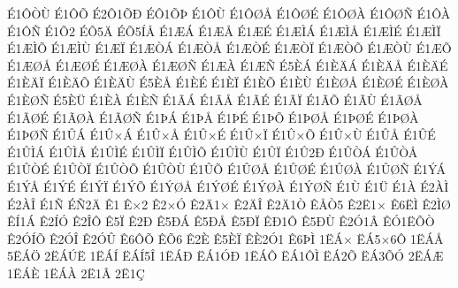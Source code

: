 {^^c91^^d4^^d2^^d9
^^c91^^d4^^d5
^^c92^^d41^^d5^^d0
^^c9^^d41^^d5^^de
^^c91^^d4^^d9
^^c91^^d4^^d8^^c5
^^c91^^d4^^d8^^c9
^^c91^^d4^^d8^^c0
^^c91^^d4^^d8^^d1
^^c91^^d4^^c0
^^c91^^d4^^d1
^^c91^^d52
^^c9^^d55^^c4
^^c9^^d55^^cd^^c5
^^c91^^c6^^c1
^^c91^^c6^^c5
^^c91^^c6^^c9
^^c91^^c6^^cc^^c1
^^c91^^c6^^cc^^c5
^^c91^^c6^^cc^^c9
^^c91^^c6^^cc^^cf
^^c91^^c6^^cc^^d5
^^c91^^c6^^cc^^d9
^^c91^^c6^^cf
^^c91^^c6^^d2^^c1
^^c91^^c6^^d2^^c5
^^c91^^c6^^d2^^c9
^^c91^^c6^^d2^^cf
^^c91^^c6^^d2^^d5
^^c91^^c6^^d2^^d9
^^c91^^c6^^d5
^^c91^^c6^^d8^^c5
^^c91^^c6^^d8^^c9
^^c91^^c6^^d8^^c0
^^c91^^c6^^d8^^d1
^^c91^^c6^^c0
^^c91^^c6^^d1
^^c95^^c8^^c1
^^c91^^c8^^c4^^c1
^^c91^^c8^^c4^^c5
^^c91^^c8^^c4^^c9
^^c91^^c8^^c4^^cf
^^c91^^c8^^c4^^d5
^^c91^^c8^^c4^^d9
^^c95^^c8^^c5
^^c91^^c8^^c9
^^c91^^c8^^cf
^^c91^^c8^^d5
^^c91^^c8^^d9
^^c91^^c8^^d8^^c5
^^c91^^c8^^d8^^c9
^^c91^^c8^^d8^^c0
^^c91^^c8^^d8^^d1
^^c95^^c8^^dc
^^c91^^c8^^c0
^^c91^^c8^^d1
^^c91^^c3^^c1
^^c91^^c3^^c5
^^c91^^c3^^c9
^^c91^^c3^^cf
^^c91^^c3^^d5
^^c91^^c3^^d9
^^c91^^c3^^d8^^c5
^^c91^^c3^^d8^^c9
^^c91^^c3^^d8^^c0
^^c91^^c3^^d8^^d1
^^c91^^de^^c1
^^c91^^de^^c5
^^c91^^de^^c9
^^c91^^de^^d5
^^c91^^de^^d8^^c5
^^c91^^de^^d8^^c9
^^c91^^de^^d8^^c0
^^c91^^de^^d8^^d1
^^c91^^db^^c1
^^c91^^db^^d7^^c1
^^c91^^db^^d7^^c5
^^c91^^db^^d7^^c9
^^c91^^db^^d7^^cf
^^c91^^db^^d7^^d5
^^c91^^db^^d7^^d9
^^c91^^db^^c5
^^c91^^db^^c9
^^c91^^db^^cc^^c1
^^c91^^db^^cc^^c5
^^c91^^db^^cc^^c9
^^c91^^db^^cc^^cf
^^c91^^db^^cc^^d5
^^c91^^db^^cc^^d9
^^c91^^db^^cf
^^c91^^db2^^d0
^^c91^^db^^d2^^c1
^^c91^^db^^d2^^c5
^^c91^^db^^d2^^c9
^^c91^^db^^d2^^cf
^^c91^^db^^d2^^d5
^^c91^^db^^d2^^d9
^^c91^^db^^d5
^^c91^^db^^d8^^c5
^^c91^^db^^d8^^c9
^^c91^^db^^d8^^c0
^^c91^^db^^d8^^d1
^^c91^^dd^^c1
^^c91^^dd^^c5
^^c91^^dd^^c9
^^c91^^dd^^cf
^^c91^^dd^^d5
^^c91^^dd^^d8^^c5
^^c91^^dd^^d8^^c9
^^c91^^dd^^d8^^c0
^^c91^^dd^^d8^^d1
^^c91^^d9
^^c91^^dc
^^c91^^c0
^^c92^^c0^^cc
^^c92^^c0^^ce
^^c91^^d1
^^c9^^d12^^c4
^^ca1
^^ca^^d72
^^ca2^^d7^^d3
^^ca2^^c41^^d7
^^ca2^^c4^^ce
^^ca2^^c41^^d2
^^ca^^c5^^d25
^^ca2^^cb1^^d7
^^ca6^^cb^^cc
^^ca2^^cc^^d8
^^ca^^cd1^^c1
^^ca2^^cd^^d3
^^ca2^^ce^^d4
^^ca5^^cf
^^ca2^^d0
^^ca5^^d0^^c1
^^ca5^^d0^^c5
^^ca5^^d0^^cf
^^ca^^d01^^d4
^^ca5^^d0^^d9
^^ca2^^d31^^c2
^^ca^^d31^^cb^^d5^^d2
^^ca2^^d3^^cd^^d5
^^ca2^^d3^^ce
^^ca2^^d3^^db
^^ca6^^d4^^d5
^^ca^^d56
^^ca2^^c8
^^ca5^^c8^^cf
^^ca^^c82^^d31
^^ca6^^de^^cc
1^^cb^^c1^^d7
^^cb^^c15^^d76^^d4
1^^cb^^c1^^c5
5^^cb^^c1^^d6
2^^cb^^c1^^da^^cb
1^^cb^^c1^^cd
^^cb^^c1^^cd5^^ce
1^^cb^^c1^^d0
^^cb^^c11^^d3^^d0
1^^cb^^c1^^d4
^^cb^^c11^^d4^^cc
^^cb^^c12^^d5
^^cb^^c13^^d5^^d3
2^^cb^^c1^^c6
1^^cb^^c1^^c8
1^^cb^^c1^^c0
2^^cb1^^c2
2^^cb1^^c7
}
